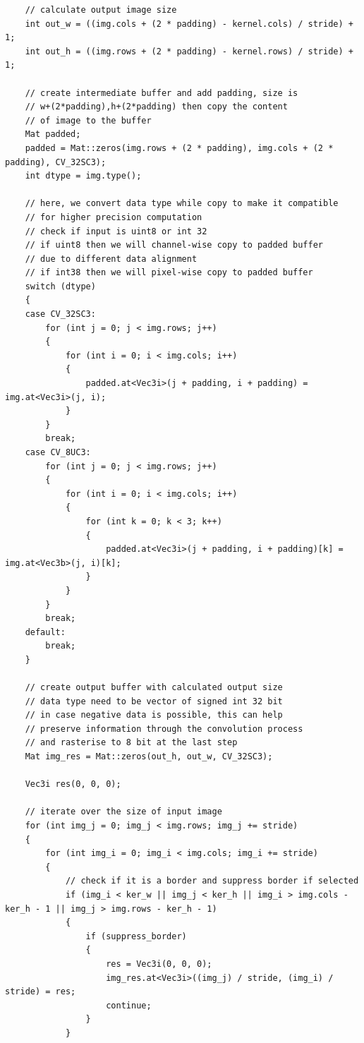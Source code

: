 \documentclass[12pt,a4paper]{report}
\begin{document}
\begin{lstlisting}
    // calculate output image size
    int out_w = ((img.cols + (2 * padding) - kernel.cols) / stride) + 1;
    int out_h = ((img.rows + (2 * padding) - kernel.rows) / stride) + 1;

    // create intermediate buffer and add padding, size is
    // w+(2*padding),h+(2*padding) then copy the content
    // of image to the buffer
    Mat padded;
    padded = Mat::zeros(img.rows + (2 * padding), img.cols + (2 * padding), CV_32SC3);
    int dtype = img.type();

    // here, we convert data type while copy to make it compatible
    // for higher precision computation
    // check if input is uint8 or int 32
    // if uint8 then we will channel-wise copy to padded buffer
    // due to different data alignment
    // if int38 then we will pixel-wise copy to padded buffer
    switch (dtype)
    {
    case CV_32SC3:
        for (int j = 0; j < img.rows; j++)
        {
            for (int i = 0; i < img.cols; i++)
            {
                padded.at<Vec3i>(j + padding, i + padding) = img.at<Vec3i>(j, i);
            }
        }
        break;
    case CV_8UC3:
        for (int j = 0; j < img.rows; j++)
        {
            for (int i = 0; i < img.cols; i++)
            {
                for (int k = 0; k < 3; k++)
                {
                    padded.at<Vec3i>(j + padding, i + padding)[k] = img.at<Vec3b>(j, i)[k];
                }
            }
        }
        break;
    default:
        break;
    }

    // create output buffer with calculated output size
    // data type need to be vector of signed int 32 bit
    // in case negative data is possible, this can help
    // preserve information through the convolution process
    // and rasterise to 8 bit at the last step
    Mat img_res = Mat::zeros(out_h, out_w, CV_32SC3);

    Vec3i res(0, 0, 0);

    // iterate over the size of input image
    for (int img_j = 0; img_j < img.rows; img_j += stride)
    {
        for (int img_i = 0; img_i < img.cols; img_i += stride)
        {
            // check if it is a border and suppress border if selected
            if (img_i < ker_w || img_j < ker_h || img_i > img.cols - ker_h - 1 || img_j > img.rows - ker_h - 1)
            {
                if (suppress_border)
                {
                    res = Vec3i(0, 0, 0);
                    img_res.at<Vec3i>((img_j) / stride, (img_i) / stride) = res;
                    continue;
                }
            }


\end{lstlisting}
\end{document}
